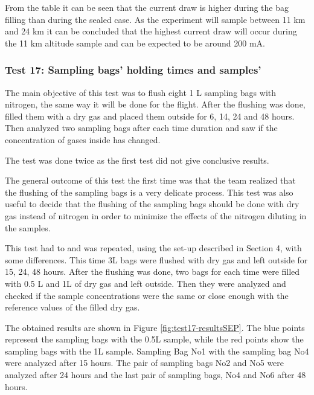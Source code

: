 \documentclass[a4paper,12pt,oneside]{article}
\begin{document}
From the table it can be seen that the current draw is higher during the bag filling than during the sealed case. As the experiment will sample between 11 km and 24 km it can be concluded that the highest current draw will occur during the 11 km altitude sample and can be expected to be around 200 mA. 

\subsubsection{Test 17: Sampling bags' holding times and samples'}
\label{sec:test17result}

The main objective of this test was to flush eight 1 L sampling bags with nitrogen, the same way it will be done for the flight. After the flushing was done, filled them with a dry gas and placed them outside for 6, 14, 24 and 48 hours. Then analyzed two sampling bags after each time duration and saw if the concentration of gases inside has changed. 

The test was done twice as the first test did not give conclusive results.

The general outcome of this test the first time was that the team realized that the flushing of the sampling bags is a very delicate process. This test was also useful to decide that the flushing of the sampling bags should be done with dry gas instead of nitrogen in order to minimize the effects of the nitrogen diluting in the samples. 

This test had to and was repeated, using the set-up described in Section 4, with some differences. This time 3L bags were flushed with dry gas and left outside for 15, 24, 48 hours. After the flushing was done, two bags for each time were filled with 0.5 L and 1L of dry gas and left outside. Then they were analyzed and checked if the sample concentrations were the same or close enough with the reference values of the filled dry gas.

The obtained results are shown in Figure \ref{fig:test17-resultsSEP}. The blue points represent the sampling bags with the 0.5L sample, while the red points show the sampling bags with the 1L sample. Sampling Bag No1 with the sampling bag No4 were analyzed after 15 hours. The pair of sampling bags No2 and No5 were analyzed after 24 hours and the last pair of sampling bags, No4 and No6 after 48 hours.  
\end{document}
